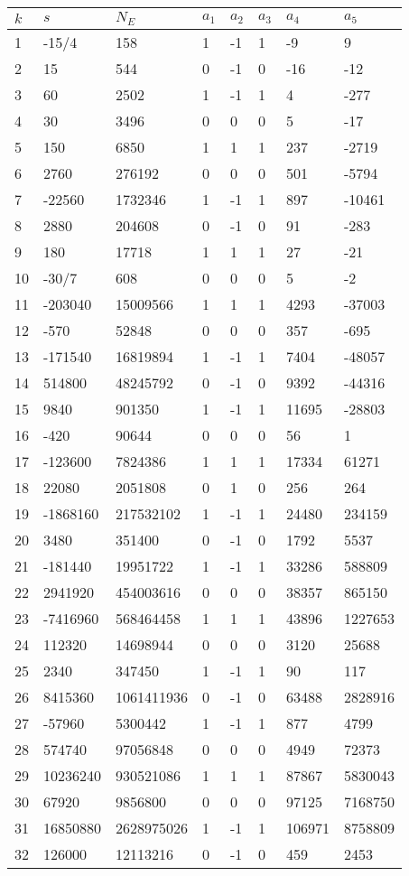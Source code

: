 \documentclass{amsart}
\begin{document}
\begin{longtable}{|l|l|l|lllll|}
\hline
$k$ & $s$ & $N_E$ & $a_1$ & $a_2$ & $a_3$ & $a_4$ & $a_5$\\
\hline
1&-15/4&158&1&-1&1&-9&9\\
2&15&544&0&-1&0&-16&-12\\
3&60&2502&1&-1&1&4&-277\\
4&30&3496&0&0&0&5&-17\\
5&150&6850&1&1&1&237&-2719\\
6&2760&276192&0&0&0&501&-5794\\
7&-22560&1732346&1&-1&1&897&-10461\\
8&2880&204608&0&-1&0&91&-283\\
9&180&17718&1&1&1&27&-21\\
10&-30/7&608&0&0&0&5&-2\\
11&-203040&15009566&1&1&1&4293&-37003\\
12&-570&52848&0&0&0&357&-695\\
13&-171540&16819894&1&-1&1&7404&-48057\\
14&514800&48245792&0&-1&0&9392&-44316\\
15&9840&901350&1&-1&1&11695&-28803\\
16&-420&90644&0&0&0&56&1\\
17&-123600&7824386&1&1&1&17334&61271\\
18&22080&2051808&0&1&0&256&264\\
19&-1868160&217532102&1&-1&1&24480&234159\\
20&3480&351400&0&-1&0&1792&5537\\
21&-181440&19951722&1&-1&1&33286&588809\\
22&2941920&454003616&0&0&0&38357&865150\\
23&-7416960&568464458&1&1&1&43896&1227653\\
24&112320&14698944&0&0&0&3120&25688\\
25&2340&347450&1&-1&1&90&117\\
26&8415360&1061411936&0&-1&0&63488&2828916\\
27&-57960&5300442&1&-1&1&877&4799\\
28&574740&97056848&0&0&0&4949&72373\\
29&10236240&930521086&1&1&1&87867&5830043\\
30&67920&9856800&0&0&0&97125&7168750\\
31&16850880&2628975026&1&-1&1&106971&8758809\\
32&126000&12113216&0&-1&0&459&2453\\

\end{longtable}
\end{document}
